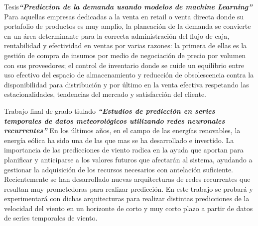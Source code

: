 \vspace{1\baselineskip}
Tesis\textbf{\textit{“Prediccion de la demanda usando modelos de machine Learning” }}\cite{hincapie2021prediccion} Para aquellas empresas dedicadas a la venta en retail o venta directa donde su portafolio de productos es muy amplio, la planeación de la demanda se convierte en un área determinante para la correcta administración del flujo de caja, rentabilidad y efectividad en ventas por varias razones: la primera de ellas es la gestión de compra de insumos por medio de negociación de precio por volumen con sus proveedores; el control de inventario donde se cuide un equilibrio entre uso efectivo del espacio de almacenamiento y reducción de obsolescencia contra la disponibilidad para distribución y por último en la venta efectiva respetando las estacionalidades, tendencias del mercado y satisfacción del cliente.



\vspace{1\baselineskip}
Trabajo final de grado tiulado \textbf{\textit{“Estudios de predicción en series temporales de datos meteorológicos utilizando redes neuronales recurrentes” }}\cite{montesdeoca2016estudios} En los últimos años, en el campo de las energías renovables, la energía eólica ha sido una de las que mas se ha desarrollado e invertido. La importancia de las predicciones de viento radica en la ayuda que aportan para planificar y anticiparse a los valores futuros que afectarán al sistema, ayudando a gestionar la adquisición de los recursos necesarios con antelación suficiente. Recientemente se han desarrollado nuevas arquitecturas de redes recurrentes que resultan muy prometedoras para realizar predicción. En este trabajo se probará y experimentará con dichas arquitecturas para realizar distintas predicciones de la velocidad del viento en un horizonte de corto y muy corto plazo a partir de datos de series temporales de viento.

